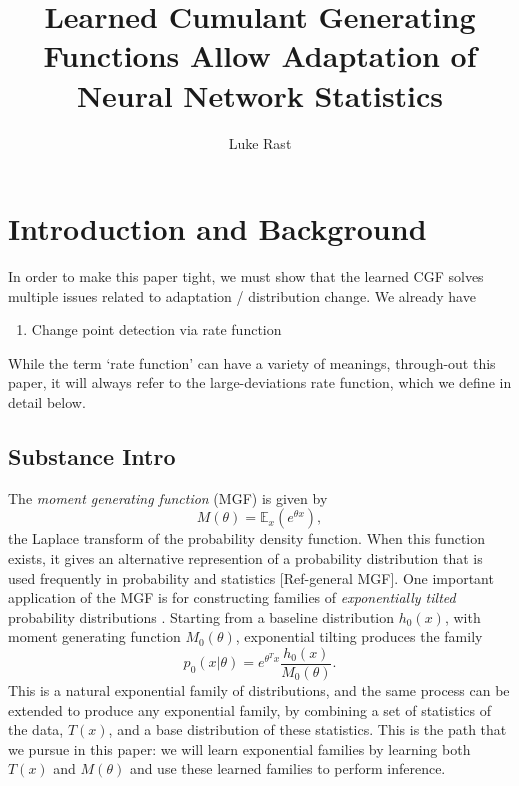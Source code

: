 \documentclass[10pt, twocolumn]{article}      %
\begin{document}
\title{Learned Cumulant Generating Functions Allow Adaptation of Neural Network Statistics}
\author{Luke Rast}
\maketitle
\linenumbers

\section{Introduction and Background}


In order to make this paper tight, we must show that the learned CGF solves multiple issues related to adaptation / distribution change.
We already have
\begin{enumerate}
  \item Change point detection via rate function
\end{enumerate}



While the term `rate function' can have a variety of meanings, through-out this paper, it will always refer to the large-deviations rate function, which we define in detail below.





\subsection{Substance Intro}


The \textit{moment generating function} (MGF) is given by
\begin{equation}
  M(\theta) = \mathbb{E}_x(e^{\theta x}),
\end{equation}
the Laplace transform of the probability density function.
When this function exists, it gives an alternative represention of a probability distribution that is used frequently in probability and statistics [Ref-general MGF].
One important application of the MGF is for constructing families of \textit{exponentially tilted} probability distributions \cite{morris_natural_1982,morris_unifying_2009}.
Starting from a baseline distribution $h_0(x)$, with moment generating function $M_0(\theta)$, exponential tilting produces the family
\begin{equation}
  p_0(x | \theta) = e^{\theta^T x} \frac{h_0(x)}{M_0(\theta)}.
\end{equation}
This is a natural exponential family of distributions, and the same process can be extended to produce any exponential family, by combining a set of statistics of the data, $T(x)$, and a base distribution of these statistics.
This is the path that we pursue in this paper: we will learn exponential families by learning both $T(x)$ and $M(\theta)$ and use these learned families to perform inference.
\end{document}
